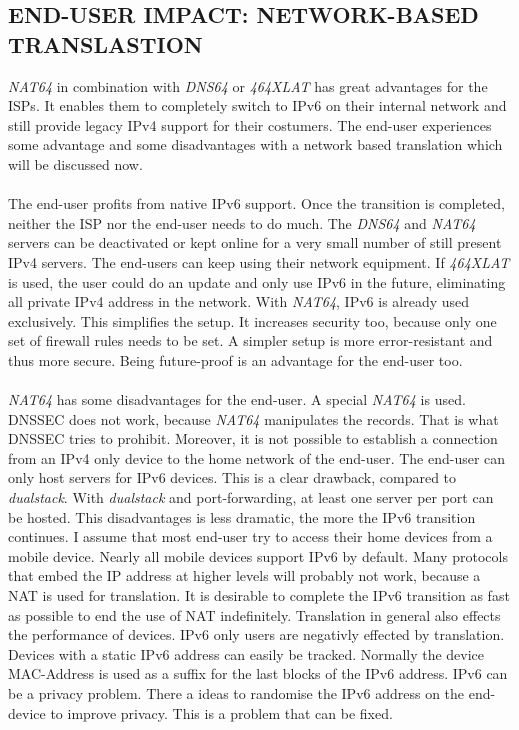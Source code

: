 \documentclass[format=sigconf, natbib=true, nonacm=true]{acmart}
\begin{document}
    \subsection*{END-USER IMPACT: NETWORK-BASED TRANSLASTION}
    \textit{NAT64} in combination with \textit{DNS64} or \textit{464XLAT} has great advantages for the ISPs. It enables them to completely switch to IPv6 on their internal network and still provide legacy IPv4 support for their costumers. The end-user experiences some advantage and some disadvantages with a network based translation which will be discussed now.\\\\The end-user profits from native IPv6 support. Once the transition is completed, neither the ISP nor the end-user needs to do much. The \textit{DNS64} and \textit{NAT64} servers can be deactivated or kept online for a very small number of still present IPv4 servers. The end-users can keep using their network equipment. If \textit{464XLAT} is used, the user could do an update and only use IPv6 in the future, eliminating all private IPv4 address in the network. With \textit{NAT64}, IPv6 is already used exclusively. This simplifies the setup. It increases security too, because only one set of firewall rules needs to be set. A simpler setup is more error-resistant and thus more secure. Being future-proof is an advantage for the end-user too.\\\\\textit{NAT64} has some disadvantages for the end-user. A special \textit{NAT64} is used. DNSSEC does not work, because \textit{NAT64} manipulates the records. That is what DNSSEC tries to prohibit. Moreover, it is not possible to establish a connection from an IPv4 only device to the home network of the end-user. The end-user can only host servers for IPv6 devices. This is a clear drawback, compared to \textit{dualstack}. With \textit{dualstack} and port-forwarding, at least one server per port can be hosted. This disadvantages is less dramatic, the more the IPv6 transition continues. I assume that most end-user try to access their home devices from a mobile device. Nearly all mobile devices support IPv6 by default. Many protocols that embed the IP address at higher levels will probably not work, because a NAT is used for translation. It is desirable to complete the IPv6 transition as fast as possible to end the use of NAT indefinitely. Translation in general also effects the performance of devices. IPv6 only users are negativly effected by translation\cite{10.1109/TNET.2015.2453338}. Devices with a static IPv6 address can easily be tracked. Normally the device MAC-Address is used as a suffix for the last blocks of the IPv6 address. IPv6 can be a privacy problem. There a ideas to randomise the IPv6 address on the end-device to improve privacy. This is a problem that can be fixed.
\end{document}
